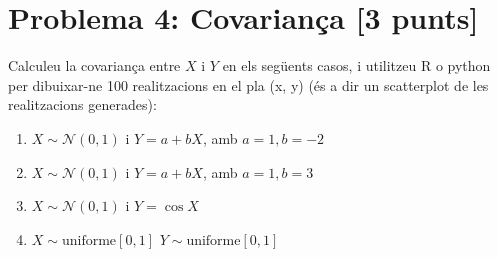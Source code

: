 \documentclass[10pt,a4paper]{article}
\begin{document}
\section{Problema 4: Covariança [3 punts]}
 
Calculeu la covariança entre $X$ i $Y$ en els següents casos, i utilitzeu R o python per dibuixar-ne 100 realitzacions en el pla (x, y) (és a dir un scatterplot de les realitzacions generades):
 
\begin{enumerate}
\item $X \sim \mathcal{N}(0, 1)$ i $Y = a + b X$, amb $a=1, b=-2$
\item $X \sim \mathcal{N}(0, 1)$ i $Y = a + b X$, amb $a=1, b=3$
\item $X \sim \mathcal{N}(0, 1)$ i $Y = \cos X$
\item $X \sim \mbox{uniforme}[0, 1]$ $Y \sim \mbox{uniforme}[0, 1]$
\end{enumerate}
\end{document}
